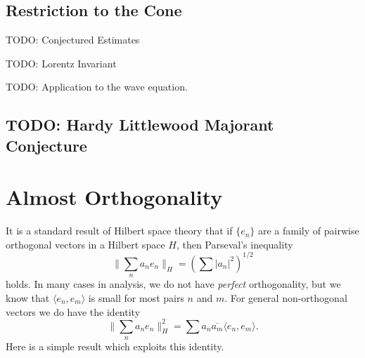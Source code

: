 \begin{comment}
for all $f \in C_c^\infty(\RR^d)$. For large $R > 0$, let $T_R(x,x_d) = (Rx,R^2x_d + R^4)$, and let $S_R = T_R(S^{d-1})$. Then
%
\[ S_R = \left\{ (x,x_d): |x_d - R^4|^2 = R^4 \left(1 - |x|^2/R^2 \right) \right\}. \]
%
For $f \in L^{q'}(S_R)$, $T_R^*f \in L^{q'}(S^{d-1})$, and
%
\[ \| T_R^* f \|_{L^{q'}(S^{d-1})} = R^{-d/q'} \| f \|_{L^{q'}(S_R)}. \]
%
If we let $E_R f = \widehat{f \cdot \sigma_R}$ be the extension operator associated with $S_R$, where $\sigma_R$ is the surface measure in $S_R$, and let $Ef = \widehat{f \cdot \sigma}$ be the extension operator associated with $S^{d-1}$, where $\sigma$ is the surface area on the unit sphere. Then $(T_R)_* \sigma = R^{-d} \sigma_R$, and so for any given $f \in C_c^\infty(\RR^d)$, we calculate simply that
%
\[ E(T_R^* f)(x,x_d) = R^{-d} e^{2 \pi i x_d} E_R f(x/R,x_d/R^2). \]
%
Thus
%
\[ \| E(T_R^* f) \|_{L^{p'}(\RR^d)} = R^{(d+1)/p'-d} \| E_R f \|_{L^{p'}(\RR^d)} \]
%
Thus we conclude that
%
\[ \| E_R f \|_{L^{p'}(\RR^d)} \lesssim R^{d-(d+1)/p'} \|T_R^* f \|_{L^{q'}(S^{d-1})} = R^{d(1-1/q')-(d+1)/p'} \| f \|_{L^{q'}(S_R)}. \]
%
TODO: Show that restriction for the sphere implies restriction for the paraboloid, and vice versa.
\end{comment}

\section{Restriction to the Cone}

TODO: Conjectured Estimates

TODO: Lorentz Invariant

TODO: Application to the wave equation.

\section{TODO: Hardy Littlewood Majorant Conjecture}




\chapter{Almost Orthogonality}

It is a standard result of Hilbert space theory that if $\{ e_n \}$ are a family of pairwise orthogonal vectors in a Hilbert space $H$, then Parseval's inequality
%
\[ \| \sum_n a_n e_n \|_H = \left( \sum |a_n|^2 \right)^{1/2} \]
%
holds. In many cases in analysis, we do not have \emph{perfect} orthogonality, but we know that $\langle e_n, e_m \rangle$ is small for most pairs $n$ and $m$. For general non-orthogonal vectors we do have the identity
%
\[ \| \sum_n a_n e_n \|_H^2 = \sum a_n \overline{a_m} \langle e_n, e_m \rangle. \]
%
Here is a simple result which exploits this identity.

